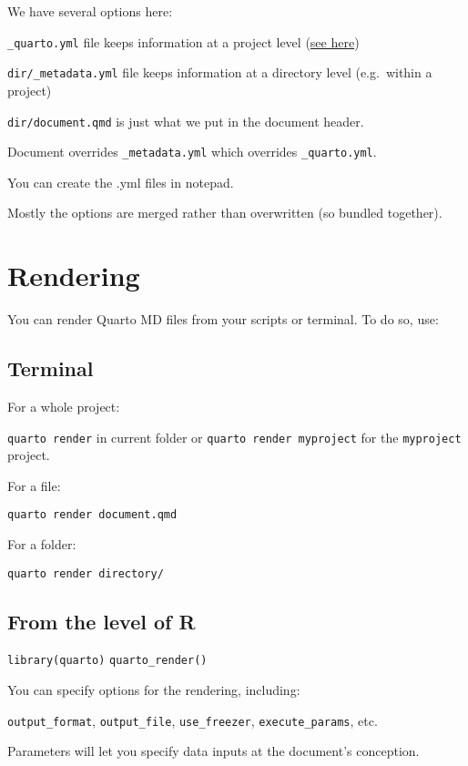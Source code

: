 \documentclass[
  letterpaper,
  DIV=11,
  numbers=noendperiod]{scrartcl}
\begin{document}
We have several options here:

\texttt{\_quarto.yml} file keeps information at a project level
(\href{https://quarto.org/docs/projects/quarto-projects.html\#project-metadata}{see
here})

\texttt{dir/\_metadata.yml} file keeps information at a directory level
(e.g.~within a project)

\texttt{dir/document.qmd} is just what we put in the document header.

Document overrides \texttt{\_metadata.yml} which overrides
\texttt{\_quarto.yml}.

You can create the .yml files in notepad.

Mostly the options are merged rather than overwritten (so bundled
together).

\hypertarget{rendering}{%
\section{Rendering}\label{rendering}}

You can render Quarto MD files from your scripts or terminal. To do so,
use:

\hypertarget{terminal}{%
\subsection{Terminal}\label{terminal}}

For a whole project:

\texttt{quarto\ render} in current folder or
\texttt{quarto\ render\ myproject} for the \texttt{myproject} project.

For a file:

\texttt{quarto\ render\ document.qmd}

For a folder:

\texttt{quarto\ render\ directory/}

\hypertarget{from-the-level-of-r}{%
\subsection{From the level of R}\label{from-the-level-of-r}}

\texttt{library(quarto)} \texttt{quarto\_render()}

You can specify options for the rendering, including:

\texttt{output\_format}, \texttt{output\_file}, \texttt{use\_freezer},
\texttt{execute\_params}, etc.

Parameters will let you specify data inputs at the document's
conception.
\end{document}
